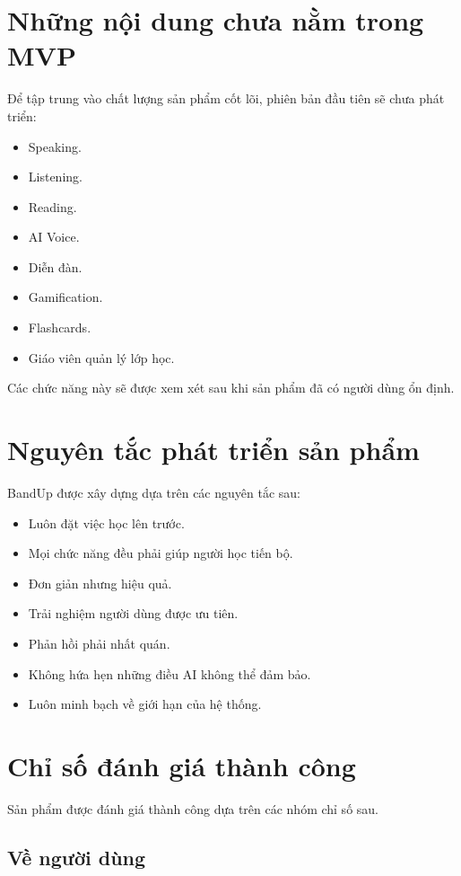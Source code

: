 \documentclass[12pt,a4paper]{article}
\begin{document}
\section{Những nội dung chưa nằm trong MVP}

Để tập trung vào chất lượng sản phẩm cốt lõi, phiên bản đầu tiên sẽ chưa phát triển:

\begin{itemize}
  \item Speaking.
  \item Listening.
  \item Reading.
  \item AI Voice.
  \item Diễn đàn.
  \item Gamification.
  \item Flashcards.
  \item Giáo viên quản lý lớp học.
\end{itemize}

Các chức năng này sẽ được xem xét sau khi sản phẩm đã có người dùng ổn định.

\section{Nguyên tắc phát triển sản phẩm}

BandUp được xây dựng dựa trên các nguyên tắc sau:

\begin{itemize}
  \item Luôn đặt việc học lên trước.
  \item Mọi chức năng đều phải giúp người học tiến bộ.
  \item Đơn giản nhưng hiệu quả.
  \item Trải nghiệm người dùng được ưu tiên.
  \item Phản hồi phải nhất quán.
  \item Không hứa hẹn những điều AI không thể đảm bảo.
  \item Luôn minh bạch về giới hạn của hệ thống.
\end{itemize}

\section{Chỉ số đánh giá thành công}

Sản phẩm được đánh giá thành công dựa trên các nhóm chỉ số sau.

\subsection{Về người dùng}
\end{document}
